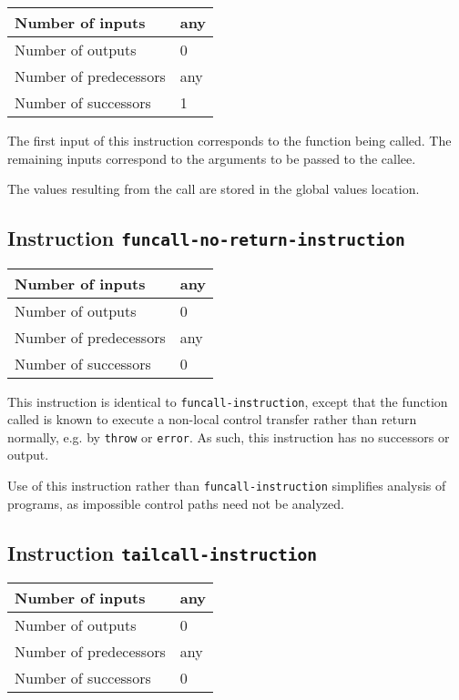 \begin{tabular}{|l|l|}
\hline
Number of inputs & any\\
\hline
Number of outputs & 0\\
\hline
Number of predecessors & any\\
\hline
Number of successors & 1\\
\hline
\end{tabular}

The first input of this instruction corresponds to the function being
called.  The remaining inputs correspond to the arguments to be passed
to the callee.

The values resulting from the call are stored in the global values
location.

\subsection{Instruction \texttt{funcall-no-return-instruction}}
\label{hir-instruction-funcall-no-return}

\begin{tabular}{|l|l|}
  \hline
  Number of inputs & any\\
  \hline
  Number of outputs & 0\\
  \hline
  Number of predecessors & any\\
  \hline
  Number of successors & 0\\
  \hline
\end{tabular}

This instruction is identical to \texttt{funcall-instruction}, except
that the function called is known to execute a non-local control
transfer rather than return normally, e.g. by \texttt{throw} or
\texttt{error}. As such, this instruction has no successors or output.

Use of this instruction rather than \texttt{funcall-instruction}
simplifies analysis of programs, as impossible control paths need not
be analyzed.

\subsection{Instruction \texttt{tailcall-instruction}}
\label{hir-instruction-tailcall}

\begin{tabular}{|l|l|}
\hline
Number of inputs & any\\
\hline
Number of outputs & 0\\
\hline
Number of predecessors & any\\
\hline
Number of successors & 0\\
\hline
\end{tabular}


